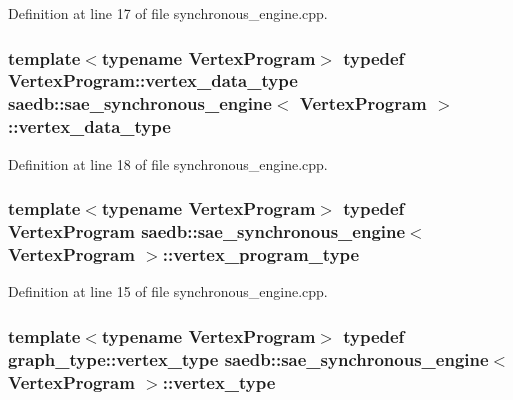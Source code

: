 Definition at line 17 of file synchronous\-\_\-engine.\-cpp.

\hypertarget{classsaedb_1_1sae__synchronous__engine_a2656a04cb1413ab13189a4ea47accdb6}{
\subsubsection[{vertex\-\_\-data\-\_\-type}]{\setlength{\rightskip}{0pt plus 5cm}template$<$typename Vertex\-Program$>$ typedef Vertex\-Program\-::vertex\-\_\-data\-\_\-type {\bf saedb\-::sae\-\_\-synchronous\-\_\-engine}$<$ Vertex\-Program $>$\-::{\bf vertex\-\_\-data\-\_\-type}}}\label{d7/d39/classsaedb_1_1sae__synchronous__engine_a2656a04cb1413ab13189a4ea47accdb6}


Definition at line 18 of file synchronous\-\_\-engine.\-cpp.

\hypertarget{classsaedb_1_1sae__synchronous__engine_a9acef979358002e4497dfc877b9fca81}{
\subsubsection[{vertex\-\_\-program\-\_\-type}]{\setlength{\rightskip}{0pt plus 5cm}template$<$typename Vertex\-Program$>$ typedef Vertex\-Program {\bf saedb\-::sae\-\_\-synchronous\-\_\-engine}$<$ Vertex\-Program $>$\-::{\bf vertex\-\_\-program\-\_\-type}}}\label{d7/d39/classsaedb_1_1sae__synchronous__engine_a9acef979358002e4497dfc877b9fca81}


Definition at line 15 of file synchronous\-\_\-engine.\-cpp.

\hypertarget{classsaedb_1_1sae__synchronous__engine_af1ef5f965b2a0f31a1dec2d6125a0b1d}{
\subsubsection[{vertex\-\_\-type}]{\setlength{\rightskip}{0pt plus 5cm}template$<$typename Vertex\-Program$>$ typedef {\bf graph\-\_\-type\-::vertex\-\_\-type} {\bf saedb\-::sae\-\_\-synchronous\-\_\-engine}$<$ Vertex\-Program $>$\-::{\bf vertex\-\_\-type}}}\label{d7/d39/classsaedb_1_1sae__synchronous__engine_af1ef5f965b2a0f31a1dec2d6125a0b1d}


